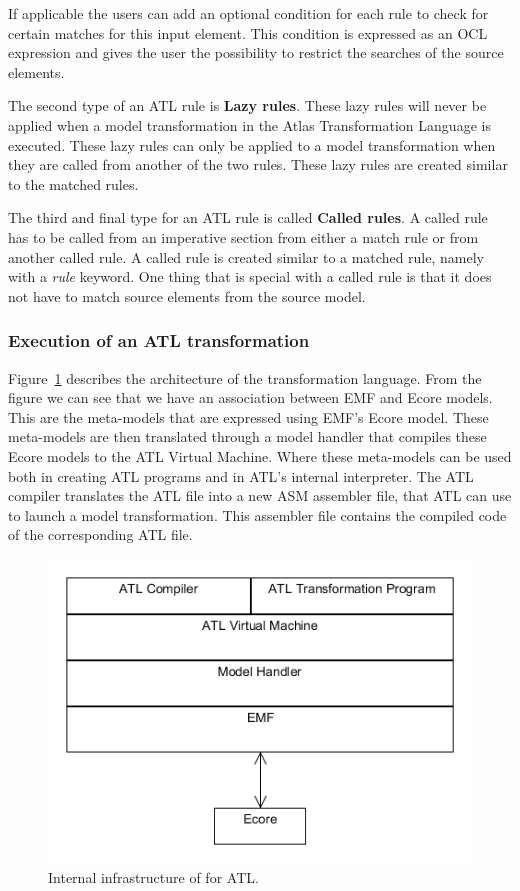 If applicable the users can add an optional condition for each rule to check for
certain matches for this input element. This condition is expressed as an OCL
expression and gives the user the possibility to restrict the searches of the
source elements. 

The second type of an ATL rule is \textbf{Lazy rules}. These lazy rules will
never be applied when a model transformation in the Atlas Transformation
Language is executed. These lazy rules can only be applied to a model
transformation when they are called from another of the two rules. These lazy
rules are created similar to the matched rules.

The third and final type for an ATL rule is called \textbf{Called rules}. A
called rule has to be called from an imperative section from either a match rule or
from another called rule. A called rule is created similar to a matched rule,
namely with a \textit{rule} keyword. One thing that is special with a called
rule is that it does not have to match source elements from the source model.

\subsubsection*{Execution of an ATL transformation}

Figure~\ref{fig:ATL_Execution} describes the architecture of the transformation
language. From the figure we can see that we have an association between EMF and
Ecore models. This are the meta-models that are expressed using EMF's Ecore
model. These meta-models are then translated through a model handler that
compiles these Ecore models to the ATL Virtual Machine. Where these meta-models
can be used both in creating ATL programs and in ATL's internal interpreter. The
ATL compiler translates the ATL file into a new ASM assembler file, that ATL can
use to launch a model transformation. This assembler file contains the
compiled code of the corresponding ATL file.

\begin{figure}[H]
	\centering
	\includegraphics[scale=0.6]{figures/ATL_Execution.png}
	\caption[Internal infrastructure for ATL]
	{Internal infrastructure of for ATL.}
	\label{fig:ATL_Execution}
\end{figure}

